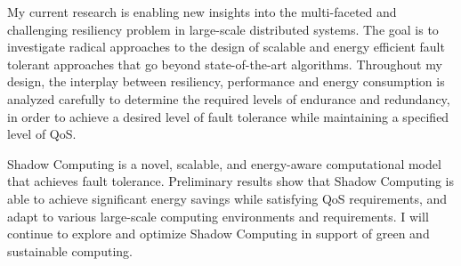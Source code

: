
My current research is enabling new insights into the multi-faceted and challenging resiliency problem in large-scale distributed systems. The goal is to investigate radical approaches to the design of
scalable and energy efficient fault tolerant approaches that go beyond state-of-the-art algorithms. Throughout my design, the interplay between resiliency, performance and energy consumption is analyzed carefully to determine the required levels of
endurance and redundancy, in order to achieve a desired level of fault tolerance while maintaining a specified level of QoS.


Shadow Computing is a novel, scalable, and energy-aware computational model that achieves fault tolerance.
Preliminary results show that Shadow Computing is able to achieve significant energy savings while satisfying QoS requirements, and adapt to various large-scale computing environments and requirements. I will continue to explore and optimize Shadow Computing in support of green and sustainable computing.